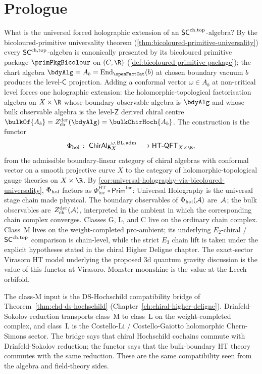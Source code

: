 \section*{Prologue}

What is the universal forced holographic extension of an
$\mathsf{SC}^{\mathrm{ch},\mathrm{top}}$-algebra? By the bicoloured-primitive universality
theorem
\textup(\cref{thm:bicoloured-primitive-universality}\textup) every
$\mathsf{SC}^{\mathrm{ch},\mathrm{top}}$-algebra is canonically presented by its bicoloured
primitive package
$\primPkgBicolour$
on $(C, \R)$
\textup(\cref{def:bicoloured-primitive-package}\textup); the chart
algebra $\bdyAlg = A_b = \mathrm{End}_{\openFactCat}(b)$ at chosen
boundary vacuum $b$ produces the level-$\mathsf{C}$ projection.
Adding a conformal vector $\omega \in A_b$ at non-critical level
forces one holographic extension: the holomorphic-topological
factorisation algebra on $X \times \R$ whose boundary observable
algebra is $\bdyAlg$ and whose bulk observable algebra is the
level-$\mathsf{Z}$ derived chiral centre
$\bulkOf{A_b} = \Zder(\bdyAlg) = \bulkChirHoch{A_b}$. The
construction is the functor
\[
 \Phihol
 \;\colon\;
 \ChirAlg^{\omega,\mathrm{BL,adm}}_X
 \longrightarrow
 \HTQFT_{X \times \R},
\]
from the admissible boundary-linear category of chiral algebras with
conformal vector on a smooth projective curve $X$ to the category of
holomorphic-topological gauge theories on $X \times \R$. By
\cref{cor:universal-holography-via-bicoloured-universality}, $\Phi_{\mathrm{hol}}$
factors as
$\Phi^{\mathrm{HT}}_{\mathrm{bic}} \circ \mathsf{Prim}^{\mathrm{bic}}$:
Universal Holography is the universal stage chain made physical. The boundary
observables of $\Phi_{\mathrm{hol}}(\mathcal{A})$ are~$\mathcal{A}$; the bulk
observables are~$Z^{\mathrm{der}}_{\mathrm{ch}}(\mathcal{A})$, interpreted in the ambient in which the
corresponding chain complex converges. Classes G, L, and C live on the
ordinary chain complex. Class~M lives on the weight-completed
pro-ambient; its underlying $E_2$-chiral / $\mathsf{SC}^{\mathrm{ch},\mathrm{top}}$ comparison is
chain-level, while the strict $E_3$ chain lift is taken under the
explicit hypotheses stated in the chiral Higher Deligne chapter.
The exact-sector Virasoro HT model underlying the proposed 3d quantum
gravity discussion is the value of this functor at Virasoro. Monster
moonshine is the value at the Leech orbifold.

The class-M input is the DS-Hochschild compatibility bridge of
Theorem~\ref*{thm:chd-ds-hochschild}
(Chapter~\ref*{ch:chiral-higher-deligne}). Drinfeld-Sokolov reduction
transports class~M to class~L on the weight-completed complex, and
class~L is the Costello-Li / Costello-Gaiotto holomorphic
Chern-Simons sector. The bridge says that chiral Hochschild cochains
commute with Drinfeld-Sokolov reduction; the functor says that the
bulk-boundary HT theory commutes with the same reduction. These are
the same compatibility seen from the algebra and field-theory sides.

